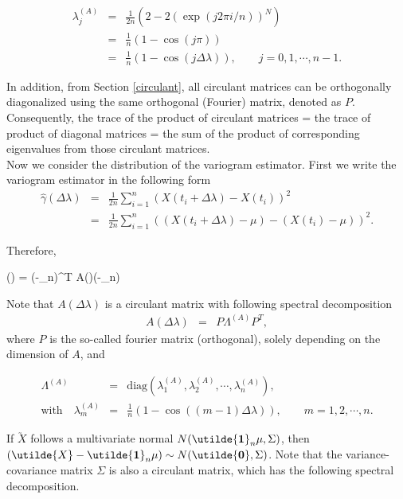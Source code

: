 \begin{eqnarray*}
\lambda_j^{(A)} &=& \frac{1}{2n}(2 - 2 (\exp(j2\pi i/n))^{N}) \\
 &=& \frac{1}{n}(1 - \cos(j\pi)) \\
 &=& \frac{1}{n}(1 - \cos(j\Delta \lambda)), \quad \quad j = 0, 1, \cdots, n-1.
\end{eqnarray*}

In addition, from Section \ref{circulant}, all circulant matrices can be orthogonally diagonalized using the same orthogonal (Fourier) matrix, denoted as $P$. Consequently,
the trace of the product of circulant matrices = the trace of product of diagonal matrices = the sum of the product of corresponding eigenvalues from those circulant matrices. \\

Now we consider the distribution of the variogram estimator. First we write the variogram estimator in the following form
\begin{eqnarray*}
\hat{\gamma}(\Delta \lambda) &=& \frac{1}{2n} \sum_{i=1}^n (X(t_i + \Delta \lambda) - X(t_i))^2  \\
&=& \frac{1}{2n} \sum_{i=1}^n ((X(t_i + \Delta \lambda)-\mu) - (X(t_i)-\mu))^2.
\end{eqnarray*}

\noi Therefore,

\beq
\hat{\gamma}(\Delta \lambda) = (-_n\mu)^T A(\Delta \lambda)(-_n\mu)
\eeq

Note that $A(\Delta \lambda)$ is a circulant matrix with following spectral decomposition
\begin{eqnarray*}
A(\Delta \lambda) &=& P \Lambda^{(A)}P^T,
\end{eqnarray*}
where $P$ is the so-called fourier matrix (orthogonal), solely depending on the dimension of $A$, and



\begin{eqnarray*}
\Lambda^{(A)} &=& \mbox{diag}(\lambda_1^{(A)}, \lambda_2^{(A)}, \cdots, \lambda_n^{(A)}), \\
\mbox{with} \quad \lambda_m^{(A)} &=& \frac{1}{n}(1 - \cos((m-1)\Delta \lambda)), \quad \quad m = 1, 2, \cdots, n.
\end{eqnarray*}

If $\utilde{X}$ follows a multivariate normal $N(\utilde{\bf 1}_n\mu, \Sigma)$, then $(\utilde{X}-\utilde{\bf 1}_n\mu) \sim N(\utilde{\bf 0}, \Sigma)$. Note that
the variance-covariance matrix $\Sigma$ is also a circulant matrix, which has the following spectral decomposition.

